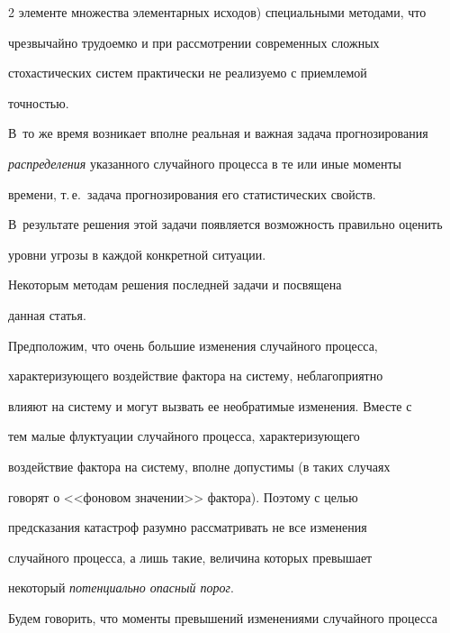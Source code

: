 \begin{multicols}{2}
элементе множества элементарных исходов) специальными методами, что


чрезвычайно трудоемко и при рассмотрении современных сложных


стохастических систем практически не реализуемо с приемлемой


точностью. 





В~то же время возникает вполне реальная и важная задача прогнозирования 


\textit{распределения} указанного случайного процесса в те или иные моменты 


времени, т.\,е.\ задача прогнозирования его статистических свойств. 


В~результате решения этой задачи появляется возможность правильно оценить 


уровни угрозы в каждой конкретной ситуации. 


{ %





}





Некоторым методам решения последней задачи и посвящена


данная статья.








Предположим, что очень большие изменения случайного процесса,


характеризующего воздействие фактора на систему, неблагоприятно


влияют на систему и могут вызвать ее необратимые изменения. Вместе с


тем малые флуктуации случайного процесса, характеризующего


воздействие фактора на систему, вполне допустимы (в таких случаях


говорят о <<фоновом значении>> фактора). Поэтому с целью


предсказания катастроф разумно рассматривать не все изменения


случайного процесса, а лишь такие, величина которых превышает


некоторый \textit{потенциально опасный порог}.





Будем говорить, что моменты превышений изменениями случайного процесса 



\end{multicols}
